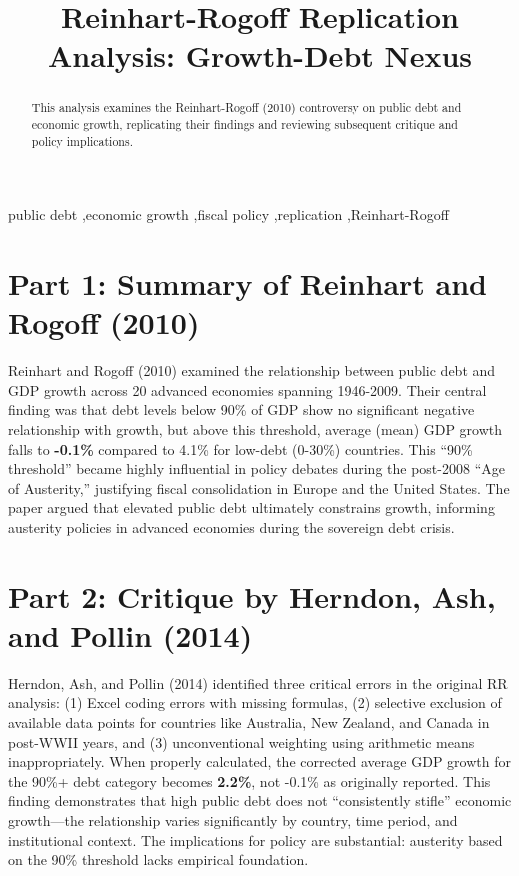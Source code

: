 \documentclass[preprint,12pt]{elsarticle}
\begin{document}
\begin{frontmatter}

\title{Reinhart-Rogoff Replication Analysis: Growth-Debt Nexus}


\begin{abstract}
This analysis examines the Reinhart-Rogoff (2010) controversy on public debt and economic growth, replicating their findings and reviewing subsequent critique and policy implications.
\end{abstract}

\begin{keyword}
public debt \sep economic growth \sep fiscal policy \sep replication \sep Reinhart-Rogoff

\end{keyword}

\end{frontmatter}

\section*{Part 1: Summary of Reinhart and Rogoff (2010)}

Reinhart and Rogoff (2010) examined the relationship between public debt and GDP growth across 20 advanced economies spanning 1946-2009. Their central finding was that debt levels below 90\% of GDP show no significant negative relationship with growth, but above this threshold, average (mean) GDP growth falls to \textbf{-0.1\%} compared to 4.1\% for low-debt (0-30\%) countries. This ``90\% threshold'' became highly influential in policy debates during the post-2008 ``Age of Austerity,'' justifying fiscal consolidation in Europe and the United States. The paper argued that elevated public debt ultimately constrains growth, informing austerity policies in advanced economies during the sovereign debt crisis.

\section*{Part 2: Critique by Herndon, Ash, and Pollin (2014)}

Herndon, Ash, and Pollin (2014) identified three critical errors in the original RR analysis: (1) Excel coding errors with missing formulas, (2) selective exclusion of available data points for countries like Australia, New Zealand, and Canada in post-WWII years, and (3) unconventional weighting using arithmetic means inappropriately. When properly calculated, the corrected average GDP growth for the 90\%+ debt category becomes \textbf{2.2\%}, not -0.1\% as originally reported. This finding demonstrates that high public debt does not ``consistently stifle'' economic growth—the relationship varies significantly by country, time period, and institutional context. The implications for policy are substantial: austerity based on the 90\% threshold lacks empirical foundation.
\end{document}
